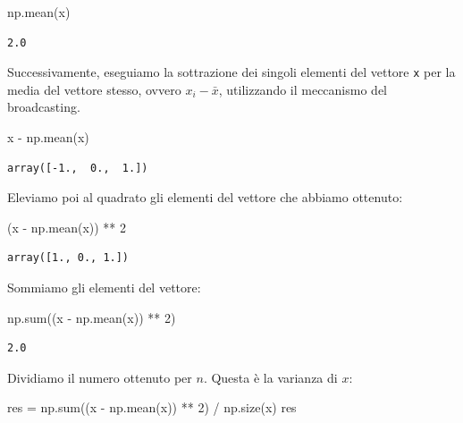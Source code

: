 \documentclass[
  letterpaper,
  krantz2]{{[}./krantz{]}}
\newenvironment{Shaded}{\begin{snugshade}}{\end{snugshade}}
\newcommand{\BuiltInTok}[1]{\textcolor[rgb]{0.00,0.23,0.31}{#1}}
\newcommand{\DecValTok}[1]{\textcolor[rgb]{0.68,0.00,0.00}{#1}}
\newcommand{\NormalTok}[1]{\textcolor[rgb]{0.00,0.23,0.31}{#1}}
\newcommand{\OperatorTok}[1]{\textcolor[rgb]{0.37,0.37,0.37}{#1}}
\begin{document}
\begin{Shaded}
\begin{Highlighting}[]
\NormalTok{np.mean(x)}
\end{Highlighting}
\end{Shaded}

\begin{verbatim}
2.0
\end{verbatim}

Successivamente, eseguiamo la sottrazione dei singoli elementi del
vettore \texttt{x} per la media del vettore stesso, ovvero
\(x_i - \bar{x}\), utilizzando il meccanismo del broadcasting.

\begin{Shaded}
\begin{Highlighting}[]
\NormalTok{x }\OperatorTok{{-}}\NormalTok{ np.mean(x)}
\end{Highlighting}
\end{Shaded}

\begin{verbatim}
array([-1.,  0.,  1.])
\end{verbatim}

Eleviamo poi al quadrato gli elementi del vettore che abbiamo ottenuto:

\begin{Shaded}
\begin{Highlighting}[]
\NormalTok{(x }\OperatorTok{{-}}\NormalTok{ np.mean(x)) }\OperatorTok{**} \DecValTok{2}
\end{Highlighting}
\end{Shaded}

\begin{verbatim}
array([1., 0., 1.])
\end{verbatim}

Sommiamo gli elementi del vettore:

\begin{Shaded}
\begin{Highlighting}[]
\NormalTok{np.}\BuiltInTok{sum}\NormalTok{((x }\OperatorTok{{-}}\NormalTok{ np.mean(x)) }\OperatorTok{**} \DecValTok{2}\NormalTok{)}
\end{Highlighting}
\end{Shaded}

\begin{verbatim}
2.0
\end{verbatim}

Dividiamo il numero ottenuto per \(n\). Questa è la varianza di \(x\):

\begin{Shaded}
\begin{Highlighting}[]
\NormalTok{res }\OperatorTok{=}\NormalTok{ np.}\BuiltInTok{sum}\NormalTok{((x }\OperatorTok{{-}}\NormalTok{ np.mean(x)) }\OperatorTok{**} \DecValTok{2}\NormalTok{) }\OperatorTok{/}\NormalTok{ np.size(x)}
\NormalTok{res}
\end{Highlighting}
\end{Shaded}
\end{document}
